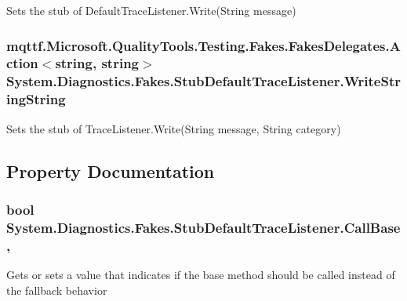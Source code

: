 Sets the stub of Default\-Trace\-Listener.\-Write(\-String message)

\hypertarget{class_system_1_1_diagnostics_1_1_fakes_1_1_stub_default_trace_listener_a0d54c4b65da9b4f677792fdf0a09baf7}{
\subsubsection[{Write\-String\-String}]{\setlength{\rightskip}{0pt plus 5cm}mqttf.\-Microsoft.\-Quality\-Tools.\-Testing.\-Fakes.\-Fakes\-Delegates.\-Action$<$string, string$>$ System.\-Diagnostics.\-Fakes.\-Stub\-Default\-Trace\-Listener.\-Write\-String\-String}}\label{class_system_1_1_diagnostics_1_1_fakes_1_1_stub_default_trace_listener_a0d54c4b65da9b4f677792fdf0a09baf7}


Sets the stub of Trace\-Listener.\-Write(\-String message, String category)



\subsection{Property Documentation}
\hypertarget{class_system_1_1_diagnostics_1_1_fakes_1_1_stub_default_trace_listener_a5396811955efa38e77c11d3e43d55d7d}{
\subsubsection[{Call\-Base}]{\setlength{\rightskip}{0pt plus 5cm}bool System.\-Diagnostics.\-Fakes.\-Stub\-Default\-Trace\-Listener.\-Call\-Base\hspace{0.3cm}{\ttfamily [get]}, {\ttfamily [set]}}}\label{class_system_1_1_diagnostics_1_1_fakes_1_1_stub_default_trace_listener_a5396811955efa38e77c11d3e43d55d7d}


Gets or sets a value that indicates if the base method should be called instead of the fallback behavior

